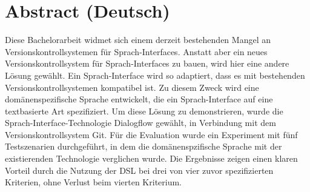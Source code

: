 \chapter*{Abstract (Deutsch)}

Diese Bachelorarbeit widmet sich einem derzeit bestehenden Mangel an Versionskontrollsystemen für Sprach-Interfaces.
Anstatt aber ein neues Versionskontrollsystem für Sprach-Interfaces zu bauen, wird hier eine andere Lösung gewählt. 
Ein Sprach-Interface wird so adaptiert, dass es mit bestehenden Versionskontrollsystemen kompatibel ist.
Zu diesem Zweck wird eine domänenspezifische Sprache entwickelt, die ein Sprach-Interface auf eine textbasierte Art spezifiziert. 
Um diese Lösung zu demonstrieren, wurde die Sprach-Interface-Technologie Dialogflow gewählt, in Verbindung mit dem Versionskontrollsystem Git.
Für die Evaluation wurde ein Experiment mit fünf Testszenarien durchgeführt, in dem die domänenspzifische Sprache mit der existierenden Technologie verglichen wurde. Die Ergebnisse zeigen einen klaren Vorteil durch die Nutzung der DSL bei drei von vier zuvor spezifizierten Kriterien, ohne Verlust beim vierten Kriterium.